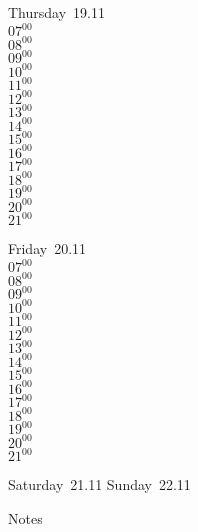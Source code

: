 \documentclass[11pt,a4paper]{book}\usepackage[]{graphicx}\usepackage[]{color}
\begin{document}
\clearpage
\begin{headerbox}
\end{headerbox}
\begin{weekdaybox}
  Thursday~19.11\\
  { 
  \vfill
  $07^{00}$\\
$08^{00}$\\
$09^{00}$\\
$10^{00}$\\
$11^{00}$\\
$12^{00}$\\
$13^{00}$\\
$14^{00}$\\
$15^{00}$\\
$16^{00}$\\
$17^{00}$\\
$18^{00}$\\
$19^{00}$\\
$20^{00}$\\
$21^{00}$\\
  }
\end{weekdaybox} 
\begin{weekdaybox}
  Friday~20.11\\
  { 
  \vfill
  $07^{00}$\\
$08^{00}$\\
$09^{00}$\\
$10^{00}$\\
$11^{00}$\\
$12^{00}$\\
$13^{00}$\\
$14^{00}$\\
$15^{00}$\\
$16^{00}$\\
$17^{00}$\\
$18^{00}$\\
$19^{00}$\\
$20^{00}$\\
$21^{00}$\\
  }
\end{weekdaybox}
\begin{weekendbox}
  Saturday~21.11
  \tcblower
  Sunday~22.11
\end{weekendbox} %
\begin{notebox}
  Notes
\end{notebox}
\clearpage
\end{document}
